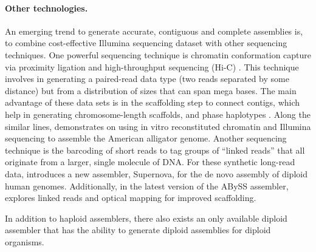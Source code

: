 \paragraph{Other technologies.}
An emerging trend to generate accurate, contiguous and complete assemblies is, to combine cost-effective Illumina sequencing dataset with other sequencing techniques. 
One powerful sequencing technique is chromatin conformation capture via proximity ligation and high-throughput sequencing (Hi-C) \citep{lieberman2009comprehensive}. 
This technique involves in generating a paired-read data type (two reads separated by some distance) but from a distribution of sizes that can span mega bases. 
The main advantage of these data sets is in the scaffolding step to connect contigs, which help in generating chromosome-length scaffolds, and phase haplotypes \citep{burton2013chromosome, selvaraj2013whole}. 
Along the similar lines, \cite{rice2017improved} demonstrates on using in vitro reconstituted chromatin and Illumina sequencing to assemble the American alligator genome. 
Another sequencing technique is the barcoding of short reads to tag groups of ``linked reads'' that all originate from a larger, single molecule of DNA. 
For these synthetic long-read data, \cite{weisenfeld2017direct} introduces a new assembler, Supernova, for the de novo assembly of diploid human genomes. 
Additionally, in the latest version of the ABySS assembler, \cite{jackman2017abyss} explores linked reads and optical mapping for improved scaffolding.

In addition to haploid assemblers, there also exists an only available diploid assembler that has the ability to generate diploid assemblies for diploid organisms.  
